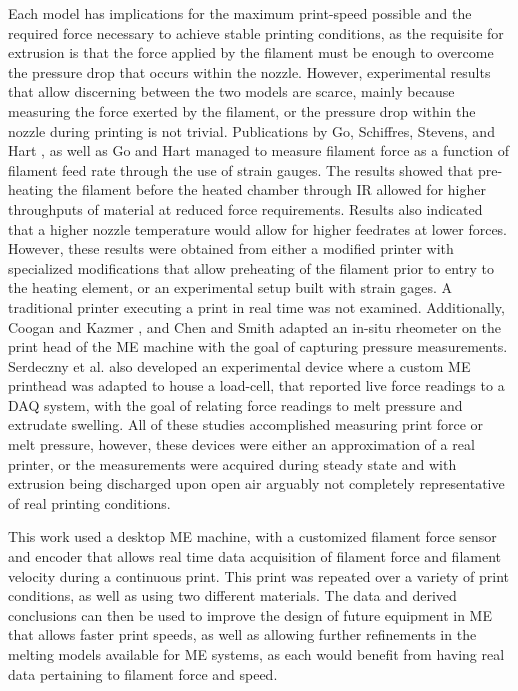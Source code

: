 \documentclass[main.tex]{subfiles}
\begin{document}
Each model has implications for the maximum print-speed possible and the required force necessary to achieve stable printing conditions, as the requisite for extrusion is that the force applied by the filament must be enough to overcome the pressure drop that occurs within the nozzle. However, experimental results that allow discerning between the two models are scarce, mainly because measuring the force exerted by the filament, or the pressure drop within the nozzle during printing is not trivial. Publications by Go, Schiffres, Stevens, and Hart \cite{Go2017}, as well as Go and Hart \cite{Go2017a} managed to measure filament force as a function of filament feed rate through the use of strain gauges. The results showed that pre-heating the filament before the heated chamber through IR allowed for higher throughputs of material at reduced force requirements. Results also indicated that a higher nozzle temperature would allow for higher feedrates at lower forces. However, these results were obtained from either a modified printer with specialized modifications that allow preheating of the filament prior to entry to the heating element, or an experimental setup built with strain gages. A traditional printer executing a print in real time was not examined. Additionally, Coogan and Kazmer \cite{Coogan2019}, and Chen and Smith \cite{Chen2019b} adapted an in-situ rheometer on the print head of the ME machine with the goal of capturing pressure measurements. Serdeczny et al. \cite{Serdeczny2019} also developed an experimental device where a custom ME printhead was adapted to house a load-cell, that reported live force readings to a DAQ system, with the goal of relating force readings to melt pressure and extrudate swelling. All of these studies accomplished measuring print force or melt pressure, however, these devices were either an approximation of a real printer, or the measurements were acquired during steady state and with extrusion being discharged upon open air \textemdash arguably not completely representative of real printing conditions.
  
This work used a desktop ME machine, with a customized filament force sensor and encoder that allows real time data acquisition of filament force and filament velocity during a continuous print. This print was repeated over a variety of print conditions, as well as using two different materials. The data and derived conclusions can then be used to improve the design of future equipment in ME that allows faster print speeds, as well as allowing further refinements in the melting models available for ME systems, as each would benefit from having real data pertaining to filament force and speed.
\end{document}
